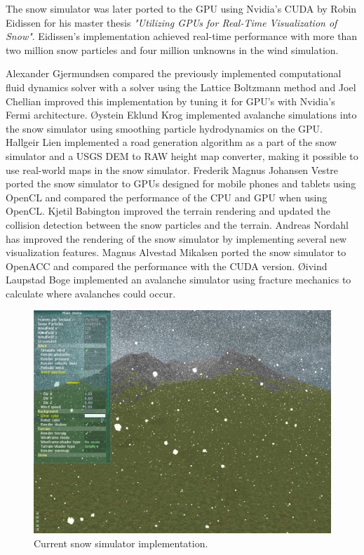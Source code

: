 The snow simulator was later ported to the GPU using Nvidia's CUDA by Robin
Eidissen for his master thesis \emph{"Utilizing GPUs for Real-Time Visualization
of Snow"}\cite{gpuSnowThesis}. Eidissen's implementation achieved real-time
performance with more than two million snow particles and four million unknowns
in the wind simulation.

Alexander Gjermundsen\cite{lbmWind} compared the previously implemented
computational fluid dynamics solver with a solver using the Lattice Boltzmann
method and Joel Chellian\cite{fermi} improved this implementation by tuning it
for GPU's with Nvidia's Fermi architecture. Øystein Eklund Krog\cite{avalanche1}
implemented avalanche simulations into the snow simulator using smoothing
particle hydrodynamics on the GPU. Hallgeir Lien\cite{road} implemented a road
generation algorithm as a part of the snow simulator and a USGS DEM to RAW
height map converter, making it possible to use real-world maps in the snow
simulator. Frederik Magnus Johansen Vestre\cite{openclSnowThesis} ported the
snow simulator to GPUs designed for mobile phones and tablets using OpenCL and
compared the performance of the CPU and GPU when using OpenCL. Kjetil
Babington\cite{snowTerrainThesis} improved the terrain rendering and updated the
collision detection between the snow particles and the terrain. Andreas
Nordahl\cite{realisticSnowTerrainThesis} has improved the rendering of the snow
simulator by implementing several new visualization features. Magnus Alvestad
Mikalsen\cite{openAccThesis} ported the snow simulator to OpenACC and compared
the performance with the CUDA version. Øivind Laupstad Boge\cite{avalanche2}
implemented an avalanche simulator using fracture mechanics to calculate where
avalanches could occur.

\begin{figure}[ht]
	\center
	\includegraphics[width=1.0\textwidth]{images/snow/gpu/snow7}
	\caption{Current snow simulator implementation.}
	\label{fig:gpuSnow}
\end{figure}


